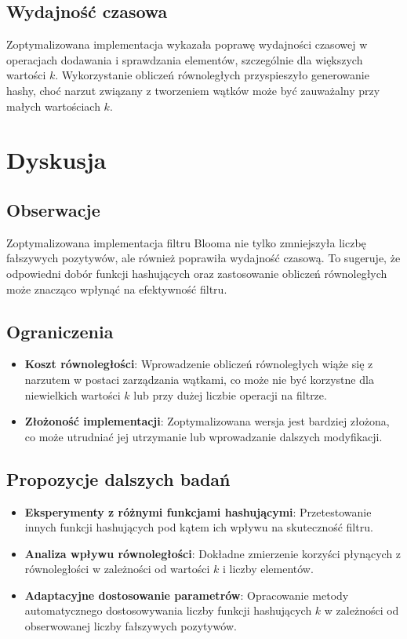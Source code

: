 \documentclass{article}
\begin{document}
\subsection{Wydajność czasowa}

Zoptymalizowana implementacja wykazała poprawę wydajności czasowej w operacjach dodawania i sprawdzania elementów, szczególnie dla większych wartości $k$. Wykorzystanie obliczeń równoległych przyspieszyło generowanie hashy, choć narzut związany z tworzeniem wątków może być zauważalny przy małych wartościach $k$.

\section{Dyskusja}

\subsection{Obserwacje}

Zoptymalizowana implementacja filtru Blooma nie tylko zmniejszyła liczbę fałszywych pozytywów, ale również poprawiła wydajność czasową. To sugeruje, że odpowiedni dobór funkcji hashujących oraz zastosowanie obliczeń równoległych może znacząco wpłynąć na efektywność filtru.

\subsection{Ograniczenia}

\begin{itemize}
    \item \textbf{Koszt równoległości}: Wprowadzenie obliczeń równoległych wiąże się z narzutem w postaci zarządzania wątkami, co może nie być korzystne dla niewielkich wartości $k$ lub przy dużej liczbie operacji na filtrze.
    \item \textbf{Złożoność implementacji}: Zoptymalizowana wersja jest bardziej złożona, co może utrudniać jej utrzymanie lub wprowadzanie dalszych modyfikacji.
\end{itemize}

\subsection{Propozycje dalszych badań}

\begin{itemize}
    \item \textbf{Eksperymenty z różnymi funkcjami hashującymi}: Przetestowanie innych funkcji hashujących pod kątem ich wpływu na skuteczność filtru.
    \item \textbf{Analiza wpływu równoległości}: Dokładne zmierzenie korzyści płynących z równoległości w zależności od wartości $k$ i liczby elementów.
    \item \textbf{Adaptacyjne dostosowanie parametrów}: Opracowanie metody automatycznego dostosowywania liczby funkcji hashujących $k$ w zależności od obserwowanej liczby fałszywych pozytywów.
\end{itemize}
\end{document}
